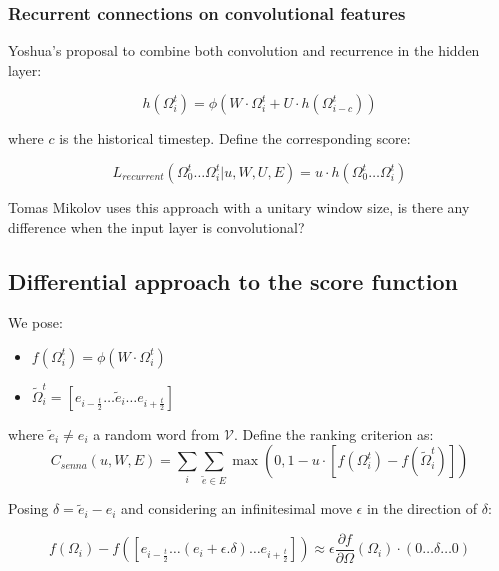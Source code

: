 \documentclass[11pt]{article} %
\begin{document}
\subsubsection{Recurrent connections on convolutional features}
Yoshua's proposal to combine both convolution and recurrence in the
hidden layer:


\[\displaystyle h \left(\Omega_i^t \right) = \phi\left( W \cdot \Omega_i^t + U  \cdot h \left(\Omega_{i-c}^{t}\right)\right)\]

where $c$ is the historical timestep. Define the corresponding score:

\[ L_{recurrent} \left(\Omega_0^t \ldots \Omega_{i}^t  | u,W,U,E\right) = u \cdot h \left( \Omega_0^t \ldots \Omega_{i}^t  \right)   \]

Tomas Mikolov uses this approach with a unitary window size, is there
any difference when the input layer is convolutional?

\subsection{Differential approach to the score function}

We pose:
\begin{itemize}[-]
\item $f(\Omega_i^t) = \phi \left( W \cdot \Omega_i^t\right)$
\item $\tilde{\Omega}_i^t = \left[e_{i-\frac{t}{2}} \ldots \tilde{e}_{i}  \ldots e_{i+\frac{t}{2}} \right] $
\end{itemize} 
where $\tilde{e}_{i}\neq e_i$ a random word from $\mathcal{V}$. Define
the ranking criterion as:
\begin{equation}
\label{eq:senna}
\displaystyle C_{senna}(u,W,E) = \sum_i \sum_{\tilde e \in E} \max
\left(0,1 - u \cdot \left[ f\left(\Omega_i^t\right) -
  f\left(\tilde{\Omega}_i^t\right) \right] \right)
\end{equation}

Posing $\delta = \tilde{e}_i - e_{i}$ and considering an infinitesimal
move $\epsilon$ in the direction of $\delta$:

\begin{equation}
\label{eq:approx}
f\left(\Omega_i\right)   - f\left(\left[ e_{i-\frac{t}{2}} \ldots (e_{i} + \epsilon . \delta)  \ldots e_{i+\frac{t}{2}}\right]\right)  \approx \epsilon \frac{\partial f }{\partial  \Omega} \left(\Omega_i\right) \cdot \left( 0\ldots \delta \ldots 0\right)
\end{equation}
\end{document}
